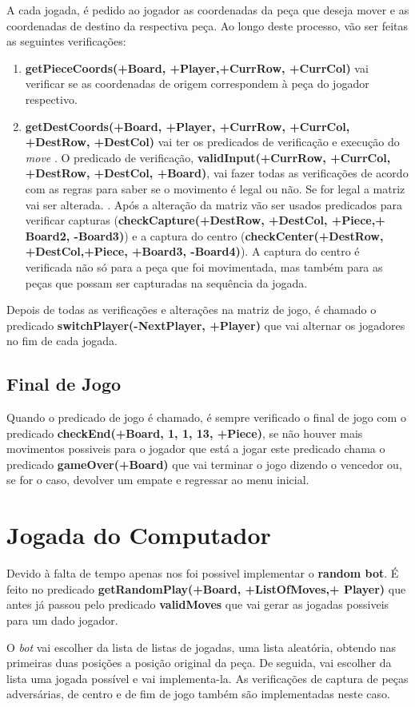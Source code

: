 \documentclass[a4paper]{article}
\begin{document}
\par A cada jogada, é pedido ao jogador as coordenadas da peça que deseja mover e as coordenadas de destino da respectiva peça. Ao longo deste processo, vão ser feitas as seguintes verificações: 
\begin{enumerate}
	\item \textbf{getPieceCoords(+Board, +Player,+CurrRow, +CurrCol)} vai verificar se as coordenadas de origem correspondem à peça do jogador respectivo. 
	\item \textbf{getDestCoords(+Board, +Player, +CurrRow, +CurrCol, +DestRow, +DestCol)} vai ter os predicados de verificação e execução do \textit{move}
	. O predicado de verificação, \textbf{validInput(+CurrRow, +CurrCol, +DestRow, +DestCol, +Board)}, vai fazer todas as verificações de acordo com as regras para saber se o movimento é legal ou não. Se for legal a matriz vai ser alterada. 
	. Após a alteração da matriz vão ser usados predicados para verificar capturas (\textbf{checkCapture(+DestRow, +DestCol, +Piece,+ Board2, -Board3)}) e a captura do centro (\textbf{checkCenter(+DestRow, \linebreak +DestCol,+Piece, +Board3, -Board4)}). A captura do centro é verificada não só para a peça que foi movimentada, mas também para as peças que possam ser capturadas na sequência da jogada. 
\end{enumerate}

Depois de todas as verificações e alterações na matriz de jogo, é chamado o predicado \textbf{switchPlayer(-NextPlayer, +Player)} que vai alternar os jogadores no fim de cada jogada.

\subsection{Final de Jogo}
Quando o predicado de jogo é chamado, é sempre verificado o final de jogo com o predicado \textbf{checkEnd(+Board, 1, 1, 13, +Piece)}, se não houver mais movimentos possiveis para o jogador que está a jogar este predicado chama o predicado \textbf{gameOver(+Board)} que vai terminar o jogo dizendo o vencedor ou, se for o caso, devolver um empate e regressar ao menu inicial.

\section{Jogada do Computador}

\par Devido à falta de tempo apenas nos foi possivel implementar o \textbf{random bot}. É feito no predicado \textbf{getRandomPlay(+Board, +ListOfMoves,+ Player)} que antes já passou pelo predicado \textbf{validMoves} que vai gerar as jogadas possiveis para um dado jogador. 
\par O \textit{bot} vai escolher da lista de listas de jogadas, uma lista aleatória, obtendo nas primeiras duas posições a posição original da peça. De seguida, vai escolher da lista uma jogada possível e vai implementa-la. As verificações de captura de peças adversárias, de centro e de fim de jogo também são implementadas neste caso. 
\end{document}
